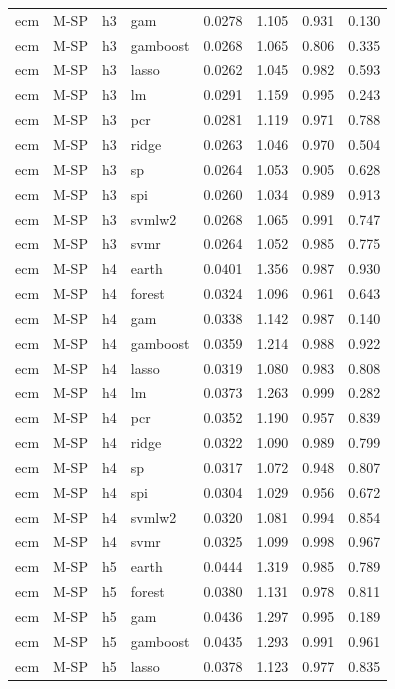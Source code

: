 \begin{ThreePartTable}
\begin{longtable}[t]{llclcccc}
ecm & M-SP & h3 & gam & 0.0278 & 1.105 & 0.931 & 0.130\\
ecm & M-SP & h3 & gamboost & 0.0268 & 1.065 & 0.806 & 0.335\\
ecm & M-SP & h3 & lasso & 0.0262 & 1.045 & 0.982 & 0.593\\
ecm & M-SP & h3 & lm & 0.0291 & 1.159 & 0.995 & 0.243\\
ecm & M-SP & h3 & pcr & 0.0281 & 1.119 & 0.971 & 0.788\\
ecm & M-SP & h3 & ridge & 0.0263 & 1.046 & 0.970 & 0.504\\
ecm & M-SP & h3 & sp & 0.0264 & 1.053 & 0.905 & 0.628\\
ecm & M-SP & h3 & spi & 0.0260 & 1.034 & 0.989 & 0.913\\
ecm & M-SP & h3 & svmlw2 & 0.0268 & 1.065 & 0.991 & 0.747\\
ecm & M-SP & h3 & svmr & 0.0264 & 1.052 & 0.985 & 0.775\\
\addlinespace
ecm & M-SP & h4 & earth & 0.0401 & 1.356 & 0.987 & 0.930\\
ecm & M-SP & h4 & forest & 0.0324 & 1.096 & 0.961 & 0.643\\
ecm & M-SP & h4 & gam & 0.0338 & 1.142 & 0.987 & 0.140\\
ecm & M-SP & h4 & gamboost & 0.0359 & 1.214 & 0.988 & 0.922\\
ecm & M-SP & h4 & lasso & 0.0319 & 1.080 & 0.983 & 0.808\\
ecm & M-SP & h4 & lm & 0.0373 & 1.263 & 0.999 & 0.282\\
ecm & M-SP & h4 & pcr & 0.0352 & 1.190 & 0.957 & 0.839\\
ecm & M-SP & h4 & ridge & 0.0322 & 1.090 & 0.989 & 0.799\\
ecm & M-SP & h4 & sp & 0.0317 & 1.072 & 0.948 & 0.807\\
ecm & M-SP & h4 & spi & 0.0304 & 1.029 & 0.956 & 0.672\\
ecm & M-SP & h4 & svmlw2 & 0.0320 & 1.081 & 0.994 & 0.854\\
ecm & M-SP & h4 & svmr & 0.0325 & 1.099 & 0.998 & 0.967\\
\addlinespace
ecm & M-SP & h5 & earth & 0.0444 & 1.319 & 0.985 & 0.789\\
ecm & M-SP & h5 & forest & 0.0380 & 1.131 & 0.978 & 0.811\\
ecm & M-SP & h5 & gam & 0.0436 & 1.297 & 0.995 & 0.189\\
ecm & M-SP & h5 & gamboost & 0.0435 & 1.293 & 0.991 & 0.961\\
ecm & M-SP & h5 & lasso & 0.0378 & 1.123 & 0.977 & 0.835\\

\end{longtable}
\end{ThreePartTable}
